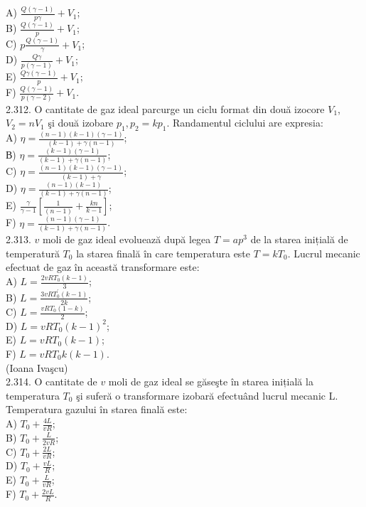 \documentclass[10pt]{article}
\begin{document}
A) $\frac{Q(\gamma-1)}{p \gamma}+V_{1}$;\\
B) $\frac{Q(\gamma-1)}{p}+V_{1}$;\\
C) $p \frac{Q(\gamma-1)}{\gamma}+V_{1}$;\\
D) $\frac{Q \gamma}{p(\gamma-1)}+V_{1}$;\\
E) $\frac{Q \gamma(\gamma-1)}{p}+V_{1}$;\\
F) $\frac{Q(\gamma-1)}{p(\gamma-2)}+V_{1}$.\\
2.312. O cantitate de gaz ideal parcurge un ciclu format din două izocore $V_{1}$, $V_{2}=n V_{1}$ şi două izobare $p_{1}, p_{2}=k p_{1}$. Randamentul ciclului are expresia:\\
A) $\eta=\frac{(n-1)(k-1)(\gamma-1)}{(k-1)+\gamma(n-1)}$;\\
В) $\eta=\frac{(k-1)(\gamma-1)}{(k-1)+\gamma(n-1)}$;\\
C) $\eta=\frac{(n-1)(k-1)(\gamma-1)}{(k-1)+\gamma}$;\\
D) $\eta=\frac{(n-1)(k-1)}{(k-1)+\gamma(n-1)}$;\\
E) $\frac{\gamma}{\gamma-1}\left[\frac{1}{(n-1)}+\frac{k n}{k-1}\right]$;\\
F) $\eta=\frac{(n-1)(\gamma-1)}{(k-1)+\gamma(n-1)}$.\\
2.313. $v$ moli de gaz ideal evoluează după legea $T=a p^{3}$ de la starea inițială de temperatură $T_{0}$ la starea finală în care temperatura este $T=k T_{0}$. Lucrul mecanic efectuat de gaz în această transformare este:\\
A) $L=\frac{2 v R T_{0}(k-1)}{3}$;\\
B) $L=\frac{3 v R T_{0}^{\prime}(k-1)}{2 k}$;\\
C) $L=\frac{v R T_{0}(1-k)}{2}$;\\
D) $L=v R T_{0}(k-1)^{2}$;\\
E) $L=v R T_{0}(k-1)$;\\
F) $L=v R T_{0} k(k-1)$.\\
(Ioana Ivaşcu)\\
2.314. O cantitate de $v$ moli de gaz ideal se găseşte în starea inițială la temperatura $T_{0}$ şi suferă o transformare izobară efectuând lucrul mecanic L. Temperatura gazului în starea finală este:\\
A) $T_{0}+\frac{4 L}{v R}$;\\
B) $T_{0}+\frac{L}{2 v R}$;\\
C) $T_{0}+\frac{2 L}{v R}$;\\
D) $T_{0}+\frac{v L}{R}$;\\
E) $T_{0}+\frac{L}{v R}$;\\
F) $T_{0}+\frac{2 v L}{R}$.
\end{document}
